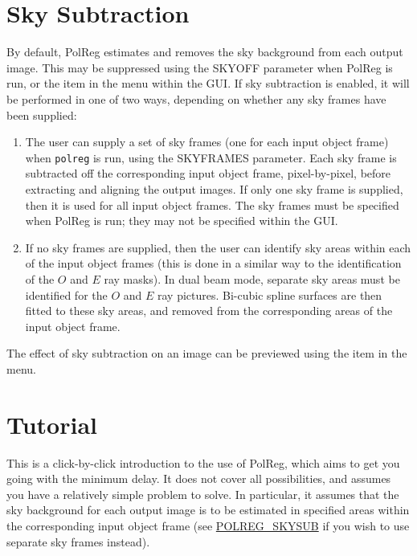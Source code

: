 \section {Sky Subtraction}
By default, PolReg estimates and removes the sky background from each
output image. This may be suppressed using the SKYOFF parameter when
PolReg is run, or the  
item in the  menu
within the GUI. If sky subtraction is enabled, it will be performed in
one of two ways, depending on whether any sky frames have been supplied:

\begin{enumerate}

\item The user can supply a set of sky frames (one for each input object
frame) when {\tt polreg} is run, using the SKYFRAMES parameter. Each sky
frame is subtracted off the corresponding input object frame,
pixel-by-pixel, before extracting and aligning the output images. If only
one sky frame is supplied, then it is used for all input object frames.
The sky frames must be specified when PolReg is run; they may not be
specified within the GUI.

\item If no sky frames are supplied, then the user can identify sky areas
within each of the input object frames (this is done in a similar way to
the identification of the $O$ and $E$ ray masks). In dual beam mode,
separate sky areas must be identified for the $O$ and $E$ ray pictures.
Bi-cubic spline surfaces are then fitted to these sky areas, and removed
from the corresponding areas of the input object frame.

\end{enumerate}

The effect of sky subtraction on an image can be previewed using the
 item in the 
 menu.

\section {Tutorial}
This is a click-by-click introduction to the use of PolReg, which aims to
get you going with the minimum delay. It does not cover all possibilities,
and assumes you have a relatively simple problem to solve. In particular, 
it assumes that the sky background for each output image is to be
estimated in specified areas within the corresponding input object frame
(see \hyperref{here}{section }{}{POLREG_SKYSUB} if you wish to use
separate sky frames instead).

